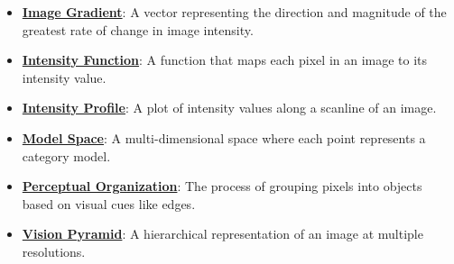 \documentclass{article}%
\begin{document}
\begin{itemize}[leftmargin=*]
\item \href{https://purdue.brightspace.com/d2l/common/assets/pdfjs-d2l-dist/1.0.14-legacy/web/viewer.html?file=%2Fcontent%2Fenforced%2F1095467-wl.202510.CS.24300.001%2F08L2-Feature Extraction.pdf%3Fou%3D1095467&lang=en-us&container=d2l-fileviewer-rendered-pdf&fullscreen=d2l-fileviewer-rendered-pdf-dialog&height=667#page=17}{\textbf{Image Gradient}}: A vector representing the direction and magnitude of the greatest rate of change in image intensity.%
\item \href{https://purdue.brightspace.com/d2l/common/assets/pdfjs-d2l-dist/1.0.14-legacy/web/viewer.html?file=%2Fcontent%2Fenforced%2F1095467-wl.202510.CS.24300.001%2F08L2-Feature Extraction.pdf%3Fou%3D1095467&lang=en-us&container=d2l-fileviewer-rendered-pdf&fullscreen=d2l-fileviewer-rendered-pdf-dialog&height=667#page=13}{\textbf{Intensity Function}}: A function that maps each pixel in an image to its intensity value.%
\item \href{https://purdue.brightspace.com/d2l/common/assets/pdfjs-d2l-dist/1.0.14-legacy/web/viewer.html?file=%2Fcontent%2Fenforced%2F1095467-wl.202510.CS.24300.001%2F08L2-Feature Extraction.pdf%3Fou%3D1095467&lang=en-us&container=d2l-fileviewer-rendered-pdf&fullscreen=d2l-fileviewer-rendered-pdf-dialog&height=667#page=14}{\textbf{Intensity Profile}}: A plot of intensity values along a scanline of an image.%
\item \href{https://purdue.brightspace.com/d2l/common/assets/pdfjs-d2l-dist/1.0.14-legacy/web/viewer.html?file=%2Fcontent%2Fenforced%2F1095467-wl.202510.CS.24300.001%2F08L2-Feature Extraction.pdf%3Fou%3D1095467&lang=en-us&container=d2l-fileviewer-rendered-pdf&fullscreen=d2l-fileviewer-rendered-pdf-dialog&height=667#page=3}{\textbf{Model Space}}: A multi-dimensional space where each point represents a category model.%
\item \href{https://purdue.brightspace.com/d2l/common/assets/pdfjs-d2l-dist/1.0.14-legacy/web/viewer.html?file=%2Fcontent%2Fenforced%2F1095467-wl.202510.CS.24300.001%2F08L2-Feature Extraction.pdf%3Fou%3D1095467&lang=en-us&container=d2l-fileviewer-rendered-pdf&fullscreen=d2l-fileviewer-rendered-pdf-dialog&height=667#page=7}{\textbf{Perceptual Organization}}: The process of grouping pixels into objects based on visual cues like edges.%
\item \href{https://purdue.brightspace.com/d2l/common/assets/pdfjs-d2l-dist/1.0.14-legacy/web/viewer.html?file=%2Fcontent%2Fenforced%2F1095467-wl.202510.CS.24300.001%2F08L2-Feature Extraction.pdf%3Fou%3D1095467&lang=en-us&container=d2l-fileviewer-rendered-pdf&fullscreen=d2l-fileviewer-rendered-pdf-dialog&height=667#page=30}{\textbf{Vision Pyramid}}: A hierarchical representation of an image at multiple resolutions.%
\end{itemize}
\end{document}
